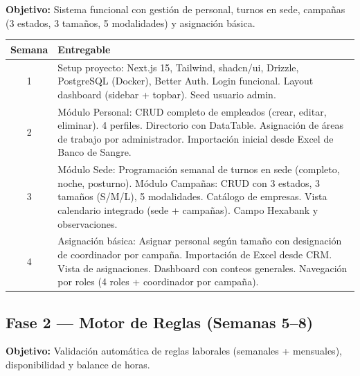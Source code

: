 \documentclass[10pt,a4paper]{article}
\begin{document}
\textbf{Objetivo:} Sistema funcional con gesti\'{o}n de personal, turnos en sede, campañas (3 estados, 3 tamaños, 5 modalidades) y asignaci\'{o}n b\'{a}sica.

\begin{table}[h!]
\centering
\begin{tabularx}{\textwidth}{|c|X|}
\hline
\textbf{Semana} & \textbf{Entregable} \\
\hline
1 & Setup proyecto: Next.js 15, Tailwind, shadcn/ui, Drizzle, PostgreSQL (Docker), Better Auth. Login funcional. Layout dashboard (sidebar + topbar). Seed usuario admin. \\
\hline
2 & M\'{o}dulo Personal: CRUD completo de empleados (crear, editar, eliminar). 4 perfiles. Directorio con DataTable. Asignaci\'{o}n de \'{a}reas de trabajo por administrador. Importaci\'{o}n inicial desde Excel de Banco de Sangre. \\
\hline
3 & M\'{o}dulo Sede: Programaci\'{o}n semanal de turnos en sede (completo, noche, posturno). M\'{o}dulo Campañas: CRUD con 3 estados, 3 tamaños (S/M/L), 5 modalidades. Cat\'{a}logo de empresas. Vista calendario integrado (sede + campañas). Campo Hexabank y observaciones. \\
\hline
4 & Asignaci\'{o}n b\'{a}sica: Asignar personal seg\'{u}n tamaño con designaci\'{o}n de coordinador por campaña. Importaci\'{o}n de Excel desde CRM. Vista de asignaciones. Dashboard con conteos generales. Navegaci\'{o}n por roles (4 roles + coordinador por campaña). \\
\hline
\end{tabularx}
\end{table}

\subsection{Fase 2 --- Motor de Reglas (Semanas 5--8)}

\textbf{Objetivo:} Validaci\'{o}n autom\'{a}tica de reglas laborales (semanales + mensuales), disponibilidad y balance de horas.
\end{document}
